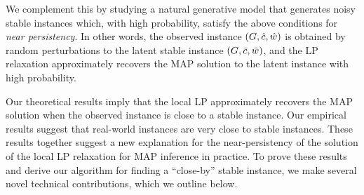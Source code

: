 We complement this by studying a natural generative model that generates noisy stable instances which, with high probability, satisfy the above conditions for {\em near persistency}. In other words, the observed instance $(G,\hat{c},\hat{w})$ is obtained by random perturbations to the latent stable instance $(G,\bar{c},\bar{w})$, and the LP relaxation approximately recovers the MAP solution to the latent instance with high probability.



Our theoretical results imply that the local LP approximately recovers the MAP solution when the observed instance is close to a stable instance. Our empirical results suggest that real-world instances are very close to stable instances. These results together suggest a new explanation for the near-persistency of the solution of the local LP relaxation for MAP inference in practice. To prove these results and derive our algorithm for finding a ``close-by'' stable instance, we make several novel technical contributions, which we outline below.


